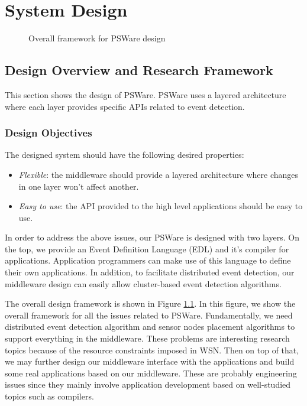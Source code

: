 \chapter{System Design}
\label{chapter:design}

\begin{figure}
\centering
{}
\caption{Overall framework for PSWare design}
\label{fig:design-research-framework}
\end{figure}

\section{Design Overview and Research Framework}
This section shows the design of PSWare. PSWare uses a layered architecture where each layer provides specific APIs related to event detection.
\subsection{Design Objectives}
The designed system should have the following desired properties:
\begin{itemize}
\item \emph{Flexible}: the middleware should provide a layered architecture where changes in one layer won't affect another.
\item \emph{Easy to use}: the API provided to the high level applications should be easy to use.
\end{itemize}

In order to address the above issues, our PSWare is designed with two layers. On the top, we provide an Event Definition Language (EDL) and it's compiler for applications. Application programmers can make use of this language to define their own applications. In addition, to facilitate distributed event detection, our middleware design can easily allow cluster-based event detection algorithms.

The overall design framework is shown in Figure \ref{fig:design-research-framework}. In this figure, we show the overall framework for all the issues related to PSWare. Fundamentally, we need distributed event detection algorithm and sensor nodes placement algorithms to support everything in the middleware. These problems are interesting research topics because of the resource constraints imposed in WSN. Then on top of that, we may further design our middleware interface with the applications and build some real applications based on our middleware. These are probably engineering issues since they mainly involve application development based on well-studied topics such as compilers.

